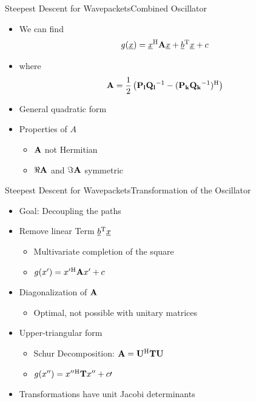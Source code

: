 \documentclass{beamer}
\begin{document}
\begin{frame}{Steepest Descent for Wavepackets}{Combined Oscillator}
  \begin{itemize}
    \item We can find
    \begin{equation*}
      g(\underline{x}) = \underline{x}{}^{\textnormal{H}} \mathbf{A} \underline{x} + \underline{b}{}^{\textnormal{T}} \underline{x} + c
    \end{equation*}
    \item where
    \begin{equation*}
      \mathbf{A} = \frac{1}{2} \left(\mathbf{P_l}\mathbf{Q_l}{}^{-1} - (\mathbf{P_k}\mathbf{Q_k}{}^{-1}){}^{\textnormal{H}} \right)
    \end{equation*}
    \item General quadratic form
    \item Properties of $A$
    \begin{itemize}
      \item $\mathbf{A}$ not Hermitian
      \item $\Re \mathbf{A}$ and $\Im \mathbf{A}$ symmetric
    \end{itemize}
  \end{itemize}
\end{frame}


\begin{frame}{Steepest Descent for Wavepackets}{Transformation of the Oscillator}
  \begin{itemize}
    \item Goal: Decoupling the paths
    \item Remove linear Term $\underline{b}{}^{\textnormal{T}} \underline{x}$
    \begin{itemize}
      \item Multivariate completion of the square
      \item $g(x^\prime) = x^\prime{}^{\textnormal{H}} \mathbf{A} x^\prime + c$
    \end{itemize}
    \item Diagonalization of $\mathbf{A}$
    \begin{itemize}
      \item Optimal, not possible with unitary matrices
    \end{itemize}
    \item Upper-triangular form
    \begin{itemize}
      \item Schur Decomposition: $\mathbf{A} = \mathbf{U}{}^{\textnormal{H}} \mathbf{T} \mathbf{U}$
      \item $g(x^{\prime\prime}) = x^{\prime\prime}{}^{\textnormal{H}} \mathbf{T} x^{\prime\prime} + c\prime$
    \end{itemize}
    \item Transformations have unit Jacobi determinants
  \end{itemize}
\end{frame}
\end{document}
